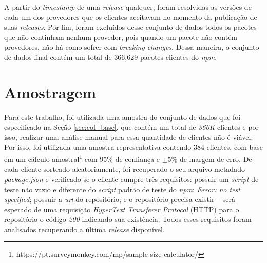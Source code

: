 A partir do \textit{timestamp} de uma \textit{release} qualquer, foram resolvidas as versões de cada um dos provedores que os clientes aceitavam no momento da publicação de suas \textit{releases}. Por fim, foram excluídos desse conjunto de dados todos os pacotes que não continham nenhum provedor, pois quando um pacote não contém provedores, não há como sofrer com \textit{breaking changes}. Dessa maneira, o conjunto de dados final contém um total de 366,629 pacotes clientes do \textit{npm}.

\section{Amostragem}
\label{sec:col_amostra}
Para este trabalho, foi utilizada uma amostra do conjunto de dados que foi especificado na Seção \ref{sec:col_base}, que contém um total de \textit{366K} clientes e por isso, realizar uma análise manual para essa quantidade de clientes não é viável. Por isso, foi utilizada uma amostra representativa contendo 384 clientes, com base em um cálculo amostral\footnote{https://pt.surveymonkey.com/mp/sample-size-calculator/} com 95\% de confiança e $\pm$5\% de margem de erro. De cada cliente sorteado aleatoriamente, foi recuperado o seu arquivo metadado \textit{package.json} e verificado se o cliente cumpre três requisitos: possuir um \textit{script} de teste não vazio e diferente do \textit{script} padrão de teste do \textit{npm}: \textit{Error: no test specified}; possuir a \textit{url} do repositório; e o repositório precisa existir -- será esperado de uma requisição \textit{HyperText Transferer Protocol} (HTTP) para o repositório o código \textit{200} indicando sua existência. Todos esses requisitos foram analisados recuperando a última \textit{release} disponível.

